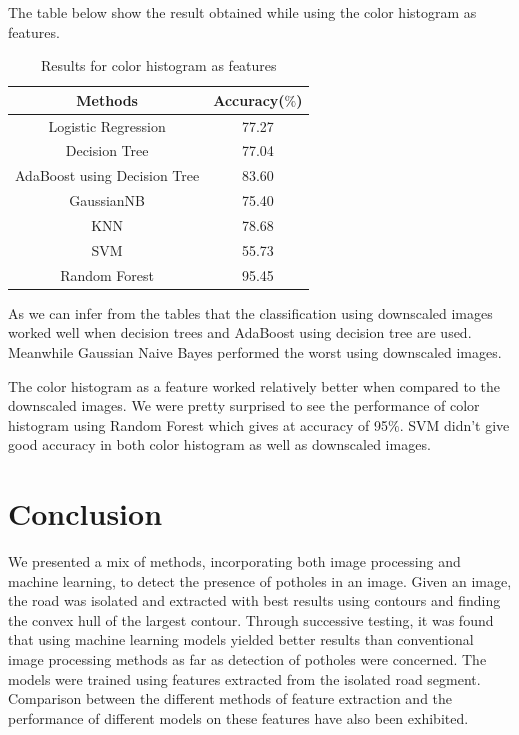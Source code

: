 \documentclass[journal]{IEEEtran}
\begin{document}
The table below show the result obtained while using the color histogram as features.
\begin{center}
\begin{table}[h!]
\centering
\begin{tabular}{ |c|c| } 
 \hline
 \rowcolor{gray}
 Methods & Accuracy($\%$)  \\ 
 \hline
 Logistic Regression & 77.27\\
 \hline
 Decision Tree & 77.04 \\ 
 \hline
 AdaBoost using Decision Tree & 83.60  \\ 
 \hline
 GaussianNB & 75.40 \\
 \hline
 KNN & 78.68\\
 \hline
 SVM & 55.73\\
 \hline
 Random Forest & 95.45\\
 \hline
\end{tabular}
\caption{Results for color histogram as features}
\label{table:1}
\end{table}
\end{center}

As we can infer from the tables that the classification using downscaled images worked well when decision trees and AdaBoost using decision tree are used. Meanwhile Gaussian Naive Bayes performed the worst using downscaled images.

\vspace{0.5cm}

The color histogram as a feature worked relatively better when compared to the downscaled images. We were pretty surprised to see the performance of color histogram using Random Forest which gives at accuracy of 
95$\%$. SVM didn't give good accuracy in both color histogram as well as downscaled images.

\section{Conclusion}
We presented a mix of methods, incorporating both image processing and machine learning, to detect the presence of potholes in an image. Given an image, the road was isolated and extracted with best results using contours and finding the convex hull of the largest contour. Through successive testing, it was found that using machine learning models yielded better results than conventional image processing methods as far as detection of potholes were concerned. The models were trained using features extracted from the isolated road segment. Comparison between the different methods of feature extraction and the performance of different models on these features have also been exhibited.
\end{document}
